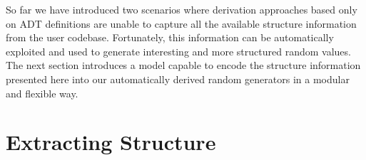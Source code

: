 






So far we have introduced two scenarios where derivation approaches based only
on ADT definitions are unable to capture all the available structure information
from the user codebase.
%
Fortunately, this information can be automatically exploited and used to
generate interesting and more structured random values.
%
The next section introduces a model capable to encode the structure information
presented here into our automatically derived random generators in a modular and
flexible way.



\section{Extracting Structure} \label{sec:hrep}




